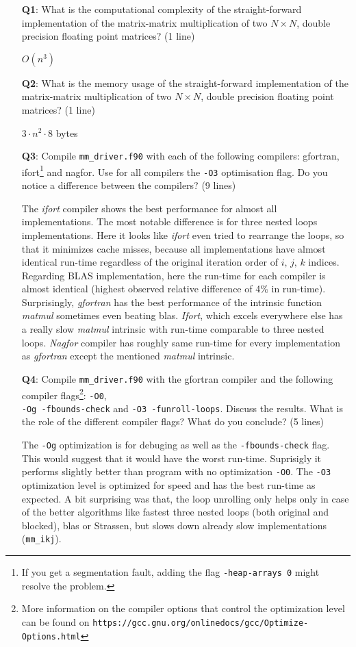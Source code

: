 \documentclass[a4paper]{article}
\newcommand{\answer}[1]{\vspace{-0.75em}\begin{framed} #1 \end{framed}\vspace{-0.75em}}
\begin{document}
\begin{itemize}
	\item[\textbf{Q1}:] What is the computational complexity of the straight-forward implementation of the matrix-matrix multiplication of two $N\times N$, double precision floating point matrices? (1 line)
	\answer{$ O(n^3) $}
	\item[\textbf{Q2}:] What is the memory usage of the straight-forward implementation of the matrix-matrix multiplication of two $N \times N$, double precision floating point matrices? (1 line)
	\answer{$ 3 \cdot n^2 \cdot 8 $ bytes}
	\item[\textbf{Q3}:] Compile \texttt{mm\_driver.f90} with each of the following compilers: gfortran, ifort\footnote{ If you get a segmentation fault, adding the flag \texttt{-heap-arrays 0} might resolve the problem.} and nagfor. Use for all compilers the \texttt{-O3} optimisation flag. Do you notice a difference between the compilers? (9 lines)
	\answer{
	The \textit{ifort} compiler shows the best performance for almost all implementations. The most notable difference is for three nested loops implementations. Here it looks like \textit{ifort} even tried to rearrange the loops, so that it minimizes cache misses, because all implementations have almost identical run-time regardless of the original iteration order of $ i,\,j,\,k $ indices. Regarding BLAS implementation, here the run-time for each compiler is almost identical (highest observed relative difference of 4\% in run-time). Surprisingly, \textit{gfortran} has the best performance of the intrinsic function \textit{matmul} sometimes even beating blas. \textit{Ifort}, which excels everywhere else has a really slow \textit{matmul} intrinsic with run-time comparable to three nested loops. \textit{Nagfor} compiler has roughly same run-time for every implementation as \textit{gfortran} except the mentioned \textit{matmul} intrinsic.
}
	\item[\textbf{Q4}:] Compile \texttt{mm\_driver.f90} with the gfortran compiler and the following compiler flags\footnote{More information on the compiler options that control the optimization level can be found on \texttt{https://gcc.gnu.org/onlinedocs/gcc/Optimize-Options.html} }: \texttt{-O0}, \\ \texttt{-Og -fbounds-check} and \texttt{-O3 -funroll-loops}. Discuss the results. What is the role of the different compiler flags? What do you conclude? (5 lines)
	\answer{
		The \texttt{-Og} optimization is for debuging as well as the \texttt{-fbounds-check} flag. This would suggest that it would have the worst run-time. Suprisigly it performs slightly better than program with no optimization \texttt{-O0}. The \texttt{-O3} optimization level is optimized for speed and has the best run-time as expected. A bit surprising was that, the loop unrolling only helps only in case of the better algorithms like fastest three nested loops (both original and blocked), blas or Strassen, but slows down already slow implementations (\texttt{mm\_ikj}).
}
\end{itemize}
\end{document}
